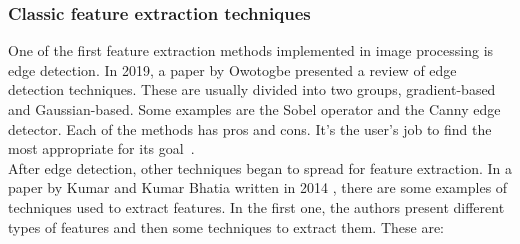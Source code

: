 \documentclass[conference]{IEEEtran}
\begin{document}
			\subsubsection{Classic feature extraction techniques}
				
				One of the first feature extraction methods implemented in image processing is edge detection.				
				In 2019, a paper by Owotogbe presented a review of edge detection techniques. 
				These are usually divided into two groups, gradient-based and Gaussian-based. 
				Some examples are the Sobel operator and the Canny edge detector. 
				Each of the methods has pros and cons. 
				It's the user's job to find the most appropriate for its goal~\cite{owotogbe2019edge}.\\
				
				After edge detection, other techniques began to spread for feature extraction. 
				In a paper by Kumar and Kumar Bhatia written in 2014 \cite{kumar2014detailed}, 
				there are some examples of techniques used to extract features. 
				In the first one, the authors present different types of features and then some techniques to extract them. 
				These are:
\end{document}

